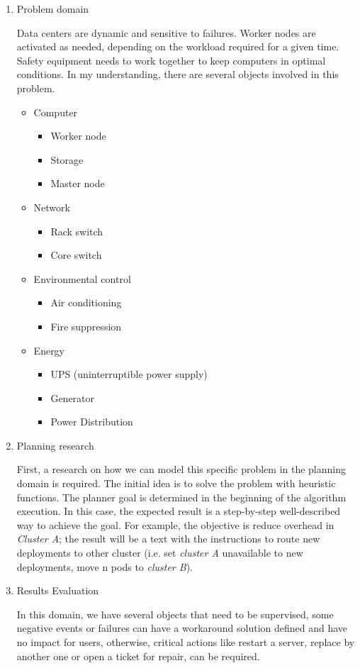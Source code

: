 \documentclass[letterpaper]{article}
\begin{document}
\begin{enumerate}
    \item Problem domain
    
Data centers are dynamic and sensitive to failures. Worker nodes are activated as needed, depending on the workload required for a given time. Safety equipment needs to work together to keep computers in optimal conditions. In my understanding, there are several objects involved in this problem.

\begin{itemize}
    \item Computer
    \begin{itemize}
        \item Worker node
        \item Storage
        \item Master node
    \end{itemize}
    \item Network
    \begin{itemize}
        \item Rack switch
        \item Core switch
    \end{itemize}
    \item Environmental control
    \begin{itemize}
        \item Air conditioning
        \item Fire suppression
    \end{itemize}
    \item Energy
    \begin{itemize}
        \item UPS (uninterruptible power supply)
        \item Generator
        \item Power Distribution
    \end{itemize}
\end{itemize}

\item Planning research

First, a research on how we can model this specific problem in the planning domain is required. The initial idea is to solve the problem with heuristic functions. The planner goal is determined in the beginning of the algorithm execution. In this case, the expected result is a step-by-step well-described way to achieve the goal. For example, the objective is reduce overhead in \textit{Cluster A}; the result will be a text with the instructions to route new deployments to other cluster (i.e. set \textit{cluster A} unavailable to new deployments, move n pods to \textit{cluster B}).

\item Results Evaluation

In this domain, we have several objects that need to be supervised, some negative events or failures can have a workaround solution defined and have no impact for users, otherwise, critical actions like restart a server, replace by another one or open a ticket for repair, can be required.

\end{enumerate}
\end{document}
